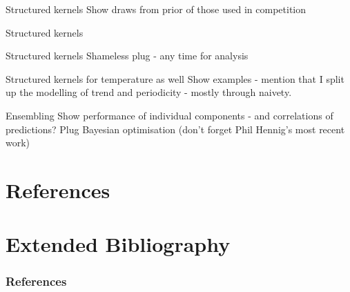 \begin{frame}{Structured kernels}
  Show draws from prior of those used in competition
\end{frame}

\begin{frame}{Structured kernels}
  \begin{centering}
    
  \end{centering}
\end{frame}

\begin{frame}{Structured kernels}
  Shameless plug - any time for analysis
\end{frame}

\begin{frame}{Structured kernels for temperature as well}
  Show examples - mention that I split up the modelling of trend and periodicity - mostly through naivety.
\end{frame}

\begin{frame}{Ensembling}
  Show performance of individual components - and correlations of predictions?
  Plug Bayesian optimisation (don't forget Phil Hennig's most recent work)
\end{frame}

{
\section{References}
\section{Extended Bibliography}
\tiny
\begin{frame}
  \frametitle{References}
  
  
\end{frame}
}

